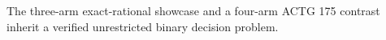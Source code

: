 The three-arm exact-rational showcase and a four-arm ACTG 175 contrast inherit a verified unrestricted binary decision problem.